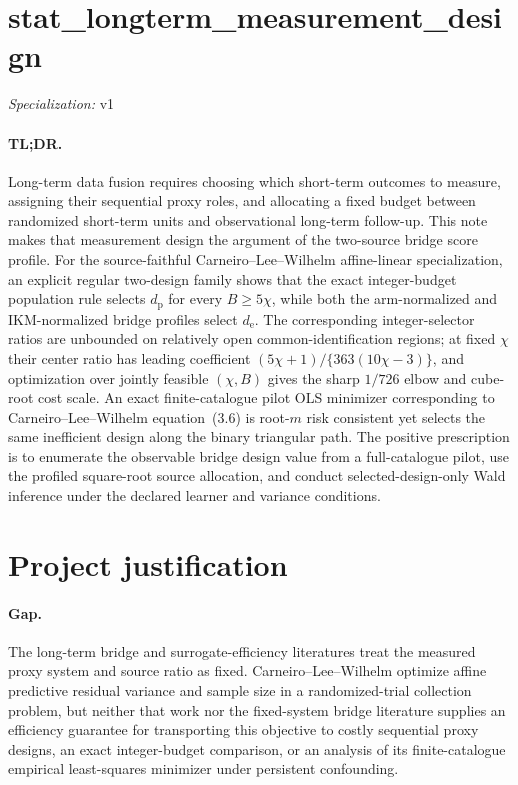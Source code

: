 \documentclass{article}
\begin{document}
\sloppy

\section*{stat\_\allowbreak{}longterm\_\allowbreak{}measurement\_\allowbreak{}design}

\noindent\textit{Specialization:} v1\par

\paragraph{TL;DR.} Long-term data fusion requires choosing which short-term outcomes to measure, assigning their sequential proxy roles, and allocating a fixed budget between randomized short-term units and observational long-term follow-up.  This note makes that measurement design the argument of the two-source bridge score profile.  For the source-faithful Carneiro--Lee--Wilhelm affine-linear specialization, an explicit regular two-design family shows that the exact integer-budget population rule selects \(d_{\mathrm p}\) for every \(B\ge5\chi\), while both the arm-normalized and IKM-normalized bridge profiles select \(d_{\mathrm e}\).  The corresponding integer-selector ratios are unbounded on relatively open common-identification regions; at fixed \(\chi\) their center ratio has leading coefficient \((5\chi+1)/\{363(10\chi-3)\}\), and optimization over jointly feasible \((\chi,B)\) gives the sharp \(1/726\) elbow and cube-root cost scale.  An exact finite-catalogue pilot OLS minimizer corresponding to Carneiro--Lee--Wilhelm equation~(3.6) is root-\(m\) risk consistent yet selects the same inefficient design along the binary triangular path.  The positive prescription is to enumerate the observable bridge design value from a full-catalogue pilot, use the profiled square-root source allocation, and conduct selected-design-only Wald inference under the declared learner and variance conditions.

\section{Project justification}

\paragraph{Gap.} The long-term bridge and surrogate-efficiency literatures treat the measured proxy system and source ratio as fixed.  Carneiro--Lee--Wilhelm optimize affine predictive residual variance and sample size in a randomized-trial collection problem, but neither that work nor the fixed-system bridge literature supplies an efficiency guarantee for transporting this objective to costly sequential proxy designs, an exact integer-budget comparison, or an analysis of its finite-catalogue empirical least-squares minimizer under persistent confounding.
\end{document}
